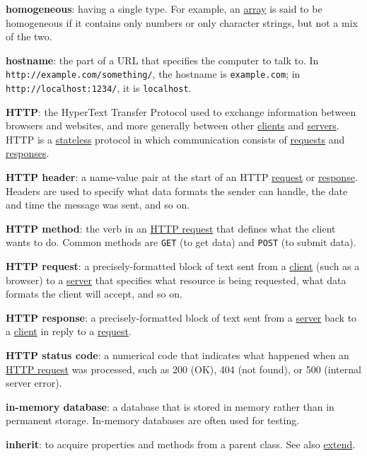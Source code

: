 \textbf{homogeneous}: having a single type. For example, an
\protect\hyperlink{g:array}{array} is said to be homogeneous if it
contains only numbers or only character strings, but not a mix of the
two.

\textbf{hostname}: the part of a URL that specifies the computer to talk
to. In \texttt{http://example.com/something/}, the hostname is
\texttt{example.com}; in \texttt{http://localhost:1234/}, it is
\texttt{localhost}.

\textbf{HTTP}: the HyperText Transfer Protocol used to exchange
information between browsers and websites, and more generally between
other \protect\hyperlink{g:client}{clients} and
\protect\hyperlink{g:server}{servers}. HTTP is a
\protect\hyperlink{g:stateless}{stateless} protocol in which
communication consists of \protect\hyperlink{g:http-request}{requests}
and \protect\hyperlink{g:http-response}{responses}.

\textbf{HTTP header}: a name-value pair at the start of an HTTP
\protect\hyperlink{g:http-request}{request} or
\protect\hyperlink{g:http-response}{response}. Headers are used to
specify what data formats the sender can handle, the date and time the
message was sent, and so on.

\textbf{HTTP method}: the verb in an
\protect\hyperlink{g:http-request}{HTTP request} that defines what the
client wants to do. Common methods are \texttt{GET} (to get data) and
\texttt{POST} (to submit data).

\textbf{HTTP request}: a precisely-formatted block of text sent from a
\protect\hyperlink{g:client}{client} (such as a browser) to a
\protect\hyperlink{g:server}{server} that specifies what resource is
being requested, what data formats the client will accept, and so on.

\textbf{HTTP response}: a precisely-formatted block of text sent from a
\protect\hyperlink{g:server}{server} back to a
\protect\hyperlink{g:client}{client} in reply to a
\protect\hyperlink{g:http-request}{request}.

\textbf{HTTP status code}: a numerical code that indicates what happened
when an \protect\hyperlink{g:http-request}{HTTP request} was processed,
such as 200 (OK), 404 (not found), or 500 (internal server error).

\textbf{in-memory database}: a database that is stored in memory rather
than in permanent storage. In-memory databases are often used for
testing.

\textbf{inherit}: to acquire properties and methods from a parent class.
See also \protect\hyperlink{g:extend}{extend}.

